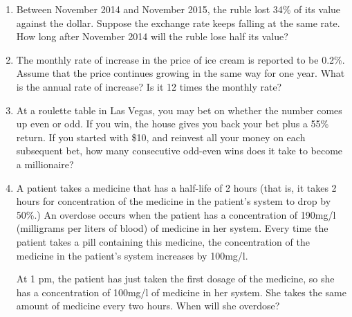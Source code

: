 \documentclass[12pt,dvipsnames]{article}
\begin{document}
\begin{enumerate}[label= {\bf  \arabic*:}]
\begin{enumerate}
\begin{enumerate}
\end{enumerate}
\end{enumerate}
\item Between November 2014 and November 2015, the ruble lost 34\% of its value against the dollar. Suppose  the exchange rate keeps falling at the same rate. How long after November 2014 will the ruble lose half its value?
\item The monthly rate of increase in the price of ice cream is reported to be 0.2\%. Assume that the price continues growing in the same way for one year. What is the annual rate of increase? Is it 12 times the monthly rate?
\item At a roulette table in Las Vegas, you may bet on whether the number comes up even or odd. If you win, the house gives you back your bet plus a 55\% return. If you started with \$10, and reinvest all your money on each subsequent bet, how many consecutive odd-even wins does it take to become a millionaire?
\item A patient takes a medicine that has a half-life of 2 hours (that is, it takes 2 hours for concentration of the medicine in the patient's system to drop by 50\%.) An overdose occurs when the patient has a  concentration of 190mg/l (milligrams per liters of blood) of medicine in her system. Every time the patient takes a pill containing this medicine, the concentration of the medicine in the patient's system increases by 100mg/l.

At 1 pm, the patient has just taken the first dosage of the medicine, so she has a concentration of 100mg/l of medicine in her system. She takes the same amount of medicine every two hours. When will she overdose?	

\end{enumerate}
\end{document}
